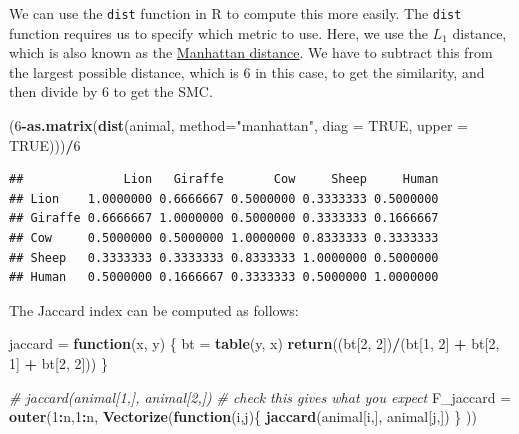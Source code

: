 \documentclass[
]{book}
\newenvironment{Shaded}{\begin{snugshade}}{\end{snugshade}}
\newcommand{\AttributeTok}[1]{\textcolor[rgb]{0.13,0.29,0.53}{#1}}
\newcommand{\CommentTok}[1]{\textcolor[rgb]{0.56,0.35,0.01}{\textit{#1}}}
\newcommand{\ConstantTok}[1]{\textcolor[rgb]{0.56,0.35,0.01}{#1}}
\newcommand{\ControlFlowTok}[1]{\textcolor[rgb]{0.13,0.29,0.53}{\textbf{#1}}}
\newcommand{\DecValTok}[1]{\textcolor[rgb]{0.00,0.00,0.81}{#1}}
\newcommand{\FunctionTok}[1]{\textcolor[rgb]{0.13,0.29,0.53}{\textbf{#1}}}
\newcommand{\NormalTok}[1]{#1}
\newcommand{\OtherTok}[1]{\textcolor[rgb]{0.56,0.35,0.01}{#1}}
\newcommand{\SpecialCharTok}[1]{\textcolor[rgb]{0.81,0.36,0.00}{\textbf{#1}}}
\newcommand{\StringTok}[1]{\textcolor[rgb]{0.31,0.60,0.02}{#1}}
\theoremstyle{definition}
\theoremstyle{definition}
\theoremstyle{definition}
\theoremstyle{definition}
\theoremstyle{remark}
\begin{document}
We can use the \texttt{dist} function in R to compute this more easily. The \texttt{dist} function requires us to specify which metric to use. Here, we use the \(L_1\) distance, which is also known as the \href{https://en.wikipedia.org/wiki/Taxicab_geometry}{Manhattan distance}. We have to subtract this from the largest possible distance, which is 6 in this case, to get the similarity, and then divide by 6 to get the SMC.

\begin{Shaded}
\begin{Highlighting}[]
\NormalTok{(}\DecValTok{6}\SpecialCharTok{{-}}\FunctionTok{as.matrix}\NormalTok{(}\FunctionTok{dist}\NormalTok{(animal, }\AttributeTok{method=}\StringTok{"manhattan"}\NormalTok{, }\AttributeTok{diag =} \ConstantTok{TRUE}\NormalTok{, }
                  \AttributeTok{upper =} \ConstantTok{TRUE}\NormalTok{)))}\SpecialCharTok{/}\DecValTok{6}
\end{Highlighting}
\end{Shaded}

\begin{verbatim}
##              Lion   Giraffe       Cow     Sheep     Human
## Lion    1.0000000 0.6666667 0.5000000 0.3333333 0.5000000
## Giraffe 0.6666667 1.0000000 0.5000000 0.3333333 0.1666667
## Cow     0.5000000 0.5000000 1.0000000 0.8333333 0.3333333
## Sheep   0.3333333 0.3333333 0.8333333 1.0000000 0.5000000
## Human   0.5000000 0.1666667 0.3333333 0.5000000 1.0000000
\end{verbatim}

The Jaccard index can be computed as follows:

\begin{Shaded}
\begin{Highlighting}[]
\NormalTok{jaccard }\OtherTok{=} \ControlFlowTok{function}\NormalTok{(x, y) \{}
\NormalTok{  bt }\OtherTok{=} \FunctionTok{table}\NormalTok{(y, x)}
  \FunctionTok{return}\NormalTok{((bt[}\DecValTok{2}\NormalTok{, }\DecValTok{2}\NormalTok{])}\SpecialCharTok{/}\NormalTok{(bt[}\DecValTok{1}\NormalTok{, }\DecValTok{2}\NormalTok{] }\SpecialCharTok{+}\NormalTok{ bt[}\DecValTok{2}\NormalTok{, }\DecValTok{1}\NormalTok{] }\SpecialCharTok{+}\NormalTok{ bt[}\DecValTok{2}\NormalTok{, }\DecValTok{2}\NormalTok{]))}
\NormalTok{\}}

\CommentTok{\# jaccard(animal[1,], animal[2,]) }
\CommentTok{\# check this gives what you expect}
\NormalTok{F\_jaccard }\OtherTok{=} \FunctionTok{outer}\NormalTok{(}\DecValTok{1}\SpecialCharTok{:}\NormalTok{n,}\DecValTok{1}\SpecialCharTok{:}\NormalTok{n, }\FunctionTok{Vectorize}\NormalTok{(}\ControlFlowTok{function}\NormalTok{(i,j)\{}
  \FunctionTok{jaccard}\NormalTok{(animal[i,], animal[j,])}
\NormalTok{  \}}
\NormalTok{  ))}
\end{Highlighting}
\end{Shaded}
\end{document}
